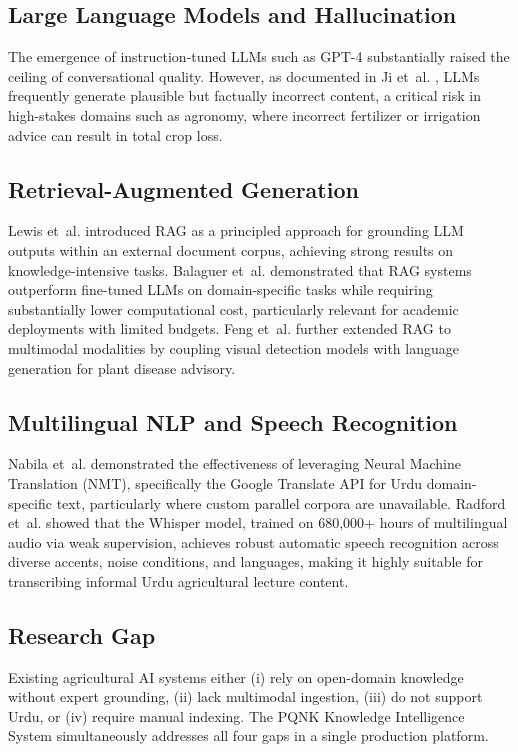 \documentclass[conference]{IEEEtran}
\begin{document}
\subsection{Large Language Models and Hallucination}
The emergence of instruction-tuned LLMs such as GPT-4 \cite{openai2024} substantially raised
the ceiling of conversational quality. However, as documented in Ji et~al. \cite{ji2023survey},
LLMs frequently generate plausible but factually incorrect content, a critical risk in
high-stakes domains such as agronomy, where incorrect fertilizer or irrigation advice can
result in total crop loss.

\subsection{Retrieval-Augmented Generation}
Lewis et~al. \cite{lewis2020rag} introduced RAG as a principled approach for grounding
LLM outputs within an external document corpus, achieving strong results on knowledge-intensive
tasks. Balaguer et~al. \cite{balaguer2024} demonstrated that RAG systems outperform
fine-tuned LLMs on domain-specific tasks while requiring substantially lower computational
cost, particularly relevant for academic deployments with limited budgets. Feng et~al.
\cite{feng2024} further extended RAG to multimodal modalities by coupling visual detection
models with language generation for plant disease advisory.

\subsection{Multilingual NLP and Speech Recognition}
Nabila et~al. \cite{nabila2022} demonstrated the effectiveness of leveraging Neural Machine
Translation (NMT), specifically the Google Translate API for Urdu domain-specific text,
particularly where custom parallel corpora are unavailable. Radford et~al. \cite{whisper2023}
showed that the Whisper model, trained on 680,000+ hours of multilingual audio via
weak supervision, achieves robust automatic speech recognition across diverse accents,
noise conditions, and languages, making it highly suitable for transcribing informal Urdu
agricultural lecture content.

\subsection{Research Gap}
Existing agricultural AI systems either (i) rely on open-domain knowledge without expert
grounding, (ii) lack multimodal ingestion, (iii) do not support Urdu, or (iv) require
manual indexing. The PQNK Knowledge Intelligence System simultaneously addresses all four
gaps in a single production platform.
\end{document}
